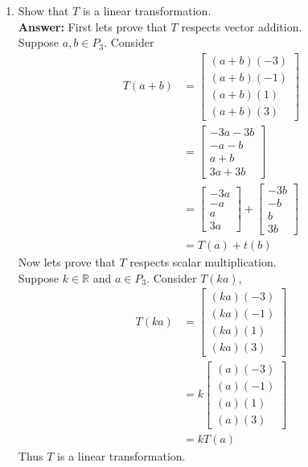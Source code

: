 \documentclass{amsart}
\def\RR{{\mathbb R}}
\begin{document}
\begin{enumerate}
\item Show that $T$ is a linear transformation.\\
\noindent \textbf{Answer: } First lets prove that $T$ respects vector addition.\\
Suppose $a,b \in P_3$. Consider 
\begin{align*}
T(a+b) &=
\begin{bmatrix}
(a+b)(-3)\\
(a+b)(-1)\\
(a+b)(1)\\
(a+b)(3)
\end{bmatrix}\\
&=
\begin{bmatrix}
-3a-3b\\
-a-b\\
a+b\\
3a+3b
\end{bmatrix}\\
&=
\begin{bmatrix}
-3a\\
-a\\
a\\
3a
\end{bmatrix}
+
\begin{bmatrix}
-3b\\
-b\\
b\\
3b
\end{bmatrix}\\
&= T(a)+t(b)
\end{align*}
Now lets prove that $T$ respects scalar multiplication.\\
Suppose $k \in \RR$ and $a \in P_3$. Consider $T(ka)$,
\begin{align*}
T(ka) &= 
\begin{bmatrix}
(ka)(-3)\\
(ka)(-1)\\
(ka)(1)\\
(ka)(3)
\end{bmatrix}\\
 &= 
 k
\begin{bmatrix}
(a)(-3)\\
(a)(-1)\\
(a)(1)\\
(a)(3)
\end{bmatrix}\\
&=kT(a)
\end{align*}
Thus $T$ is a linear transformation. 
\vspace{1in}


\end{enumerate}
\end{document}
